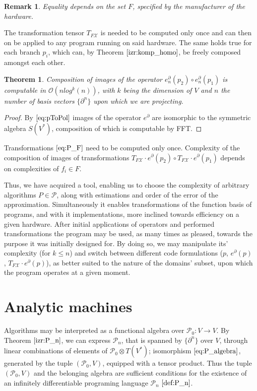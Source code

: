 \documentclass{article}
\newcommand{\X}{\mathcal{X}}
\newcommand{\dP}{\mathcal{P}}
\newcommand{\D}{\partial}
\newtheorem{izrek}{Theorem}[section]
\newtheorem{opomba}{Remark}[section]
\begin{document}
\begin{opomba}
Equality depends on the set $F$, specified by the manufacturer of the hardware.
\end{opomba}

The transformation tensor $T_{F\X}$ is needed to be computed only once and can then on be applied to any program running on said hardware. The same holds true for each branch $p_i$, which can, by Theorem $\ref{izr:komp_homo}$, be freely composed amongst each other.

\begin{izrek}
Composition of images of the operator $e_n^\D(p_2)\circ e_n^\D(p_1)$ is computable in $\mathcal{O}(nlog^k(n))$, with $k$ being the dimension of $V$ and $n$ the number of basis vectors $\{\D^n\}$ upon which we are projecting.
\end{izrek}

\begin{proof}
	By $\eqref{eq:pToPol}$ images of the operator $e^\D$ are isomorphic to the symmetric algebra $S(V^*)$, composition of which is computable by FFT.
\end{proof}

Transformations $\eqref{eq:P_F}$ need to be computed only once. Complexity of the composition of images of transformations $T_{F\X}\cdot e^\D(p_2)\circ T_{F\X}\cdot e^\D(p_1)$ depends on complexities of $f_i\in F$.

Thus, we have acquired a tool, enabling us to choose the complexity of arbitrary algorithms $P\in\dP$, along with estimations and order of the error of the approximation. Simultaneously it enables transformations of the function basis of programs, and with it implementations, more inclined towards efficiency on a given hardware. After initial applications of operators and performed transformations the program may be used, as many times as pleased, towards the purpose it was initially designed for. By doing so, we may manipulate its' complexity (for $k\le n$) and switch between different code formulations ($p$, $e^\D(p)$, $T_{F\X}\cdot e^\D(p)$), as better suited to the nature of the domains' subset, upon which the program operates at a given moment.

\section{Analytic machines}
Algorithms may be interpreted as a functional algebra over $\dP_0:V\to V$.
By Theorem $\ref{izr:P_n}$, we can express $\dP_n$, that is spanned by $\{\D^n\}$ over $V$, through linear combinations of elements of $\dP_0\otimes T(V^*)$; isomorphism $\eqref{eq:P_algebra}$, generated by the tuple $(\dP_0,V)$, equipped with a tensor product. Thus the tuple  $(\dP_0,V)$ and the belonging algebra are sufficient conditions for the existence of an infinitely differentiable programing language $\dP_n$ $\eqref{def:P_n}$.
\end{document}
